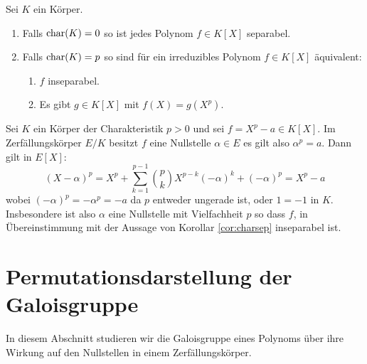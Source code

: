 \documentclass{book}
\begin{document}
\begin{cor} Sei $K$ ein Körper. 
    \label{cor:charsep}
    \begin{enumerate}
        \item Falls $\operatorname{char}(K) = 0$ so ist jedes Polynom $f \in K[X]$ separabel.
        \item Falls $\operatorname{char}(K) = p$ so sind für ein irreduzibles Polynom $f \in K[X]$ äquivalent:
            \begin{enumerate}[label=(\roman *)]
                \item $f$ inseparabel.
                \item Es gibt $g \in K[X]$ mit $f(X) = g(X^p)$. 
            \end{enumerate}
    \end{enumerate}
\end{cor}

\begin{exa}
    \label{exa:insep}
    Sei $K$ ein Körper der Charakteristik $p > 0$ und sei $f = X^p - a \in
    K[X]$. Im Zerfällungskörper $E/K$ besitzt $f$ eine Nullstelle $\alpha \in
    E$ es gilt also $\alpha^p = a$. Dann gilt in $E[X]$:
    \[
        (X-\alpha)^p = X^p + \sum_{k=1}^{p-1} {p \choose k} X^{p-k} (-\alpha)^{k} + (- \alpha)^p = X^p - a 
    \]
    wobei $(-\alpha)^p = - \alpha^p = -a$ da $p$ entweder ungerade ist, oder $1 = -1$ in $K$. 
    Insbesondere ist also $\alpha$ eine Nullstelle mit Vielfachheit $p$ so dass
    $f$, in Übereinstimmung mit der Aussage von Korollar \ref{cor:charsep}
    inseparabel ist. 
\end{exa}


\section{Permutationsdarstellung der Galoisgruppe}%
\label{sub:permutationsdarstellung_der_galoisgruppe}

In diesem Abschnitt studieren wir die Galoisgruppe eines Polynoms über ihre
Wirkung auf den Nullstellen in einem Zerfällungskörper. 
\end{document}
